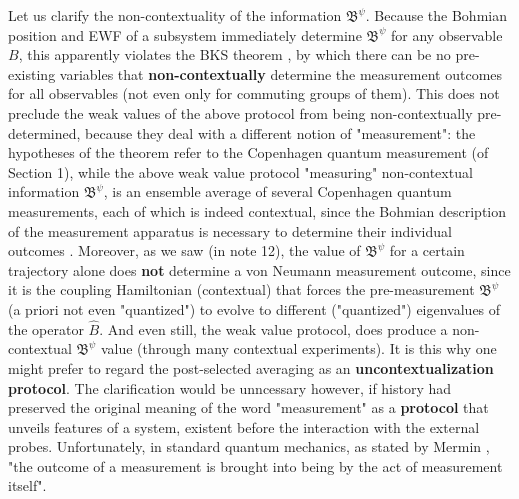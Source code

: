 \documentclass[11pt, a4paper]{article} %
\newcommand{\B}{\mathfrak{B}}
\begin{document}
Let us clarify the non-contextuality of the information $\B^\psi$. Because the Bohmian position and EWF of a subsystem immediately determine $\B^\psi$ for any observable $B$, this apparently violates the BKS theorem \cite{Mermin}, by which there can be no pre-existing variables that {\bf non-contextually} determine the measurement outcomes for all observables (not even only for commuting groups of them). This does not preclude the weak values of the above protocol from being non-contextually pre-determined, because they deal with a different notion of "measurement": the hypotheses of the theorem refer to the Copenhagen quantum measurement (of Section 1), while the above weak value protocol "measuring" non-contextual information $\B^\psi$, is an ensemble average of several Copenhagen quantum measurements, each of which is indeed contextual, since the Bohmian description of the measurement apparatus is necessary to determine their individual outcomes \cite{operatorsObservables}. Moreover, as we saw (in note 12), the value of $\B^\psi$ for a certain trajectory alone does {\bf not} determine a von Neumann measurement outcome, since it is the coupling Hamiltonian (contextual) that forces the pre-measurement $\B^\psi$ (a priori not even "quantized") to evolve to different ("quantized") eigenvalues of the operator $\hat{B}$. And even still, the weak value protocol, does produce a non-contextual $\B^\psi$ value (through many contextual experiments). It is this why one might prefer to regard the post-selected averaging as an {\bf uncontextualization protocol}. The clarification would be unncessary however, if history had preserved the original meaning of the word "measurement" as a {\bf protocol} that unveils features of a system, existent before the interaction with the external probes. Unfortunately, in standard quantum mechanics, as stated by Mermin \cite{Mermin}, "the outcome of a measurement is brought into being by the act of measurement itself".
\vspace{-0.3cm}
\end{document}
